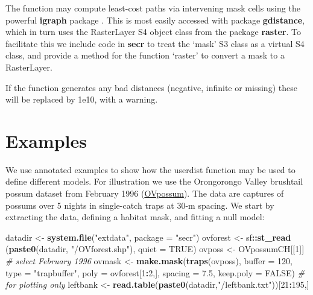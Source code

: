 \documentclass[
]{book}
\newenvironment{Shaded}{\begin{snugshade}}{\end{snugshade}}
\newcommand{\AttributeTok}[1]{\textcolor[rgb]{0.13,0.29,0.53}{#1}}
\newcommand{\CommentTok}[1]{\textcolor[rgb]{0.56,0.35,0.01}{\textit{#1}}}
\newcommand{\ConstantTok}[1]{\textcolor[rgb]{0.56,0.35,0.01}{#1}}
\newcommand{\DecValTok}[1]{\textcolor[rgb]{0.00,0.00,0.81}{#1}}
\newcommand{\FloatTok}[1]{\textcolor[rgb]{0.00,0.00,0.81}{#1}}
\newcommand{\FunctionTok}[1]{\textcolor[rgb]{0.13,0.29,0.53}{\textbf{#1}}}
\newcommand{\NormalTok}[1]{#1}
\newcommand{\OtherTok}[1]{\textcolor[rgb]{0.56,0.35,0.01}{#1}}
\newcommand{\SpecialCharTok}[1]{\textcolor[rgb]{0.81,0.36,0.00}{\textbf{#1}}}
\newcommand{\StringTok}[1]{\textcolor[rgb]{0.31,0.60,0.02}{#1}}
\begin{document}
The function may compute least-cost paths via intervening mask cells using the powerful \textbf{igraph} package \citep{cn06}. This
is most easily accessed with package \textbf{gdistance}, which in turn uses the RasterLayer S4 object class from the package \textbf{raster}. To facilitate this we include code in \textbf{secr} to treat the `mask' S3 class as a virtual S4 class, and provide a method for the function `raster' to convert a mask to a RasterLayer.

If the function generates any bad distances (negative, infinite or missing) these will be replaced by 1e10, with a warning.

\section{Examples}\label{examples}

We use annotated examples to show how the userdist function may be used to define different models. For illustration we use the Orongorongo Valley brushtail possum dataset from February 1996 (\href{https://www.otago.ac.nz/density/html/OVpossum.html}{OVpossum}). The data are captures of possums over 5 nights in single-catch traps at 30-m spacing. We start by extracting the data, defining a habitat mask, and fitting a null model:

\begin{Shaded}
\begin{Highlighting}[]
\NormalTok{datadir }\OtherTok{\textless{}{-}} \FunctionTok{system.file}\NormalTok{(}\StringTok{"extdata"}\NormalTok{, }\AttributeTok{package =} \StringTok{"secr"}\NormalTok{)}
\NormalTok{ovforest }\OtherTok{\textless{}{-}}\NormalTok{ sf}\SpecialCharTok{::}\FunctionTok{st\_read}\NormalTok{ (}\FunctionTok{paste0}\NormalTok{(datadir, }\StringTok{"/OVforest.shp"}\NormalTok{), }
    \AttributeTok{quiet =} \ConstantTok{TRUE}\NormalTok{)}
\NormalTok{ovposs }\OtherTok{\textless{}{-}}\NormalTok{ OVpossumCH[[}\DecValTok{1}\NormalTok{]]  }\CommentTok{\# select February 1996}
\NormalTok{ovmask }\OtherTok{\textless{}{-}} \FunctionTok{make.mask}\NormalTok{(}\FunctionTok{traps}\NormalTok{(ovposs), }\AttributeTok{buffer =} \DecValTok{120}\NormalTok{, }\AttributeTok{type =} \StringTok{"trapbuffer"}\NormalTok{, }
    \AttributeTok{poly =}\NormalTok{ ovforest[}\DecValTok{1}\SpecialCharTok{:}\DecValTok{2}\NormalTok{,], }\AttributeTok{spacing =} \FloatTok{7.5}\NormalTok{, }\AttributeTok{keep.poly =} \ConstantTok{FALSE}\NormalTok{)}
\CommentTok{\# for plotting only}
\NormalTok{leftbank }\OtherTok{\textless{}{-}} \FunctionTok{read.table}\NormalTok{(}\FunctionTok{paste0}\NormalTok{(datadir,}\StringTok{"/leftbank.txt"}\NormalTok{))[}\DecValTok{21}\SpecialCharTok{:}\DecValTok{195}\NormalTok{,]}
\end{Highlighting}
\end{Shaded}
\end{document}
